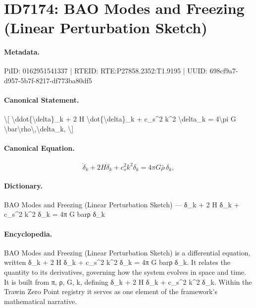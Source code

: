 \section*{ID7174: BAO Modes and Freezing (Linear Perturbation Sketch)}
\paragraph{Metadata.}
PiID: 0162951541337 | RTEID: RTE:P27858.2352:T1.9195 | UUID: 698cf9a7-d957-5b7f-8217-df773ba80df5

\paragraph{Canonical Statement.}
\textbackslash{}[ \textbackslash{}ddot\{\textbackslash{}delta\}\_k + 2 H \textbackslash{}dot\{\textbackslash{}delta\}\_k + c\_s\textasciicircum{}2 k\textasciicircum{}2 \textbackslash{}delta\_k = 4\textbackslash{}pi G \textbackslash{}bar\textbackslash{}rho\textbackslash{},\textbackslash{}delta\_k, \textbackslash{}]

\paragraph{Canonical Equation.}
\[
\ddot{\delta}_k + 2 H \dot{\delta}_k + c_s^2 k^2 \delta_k = 4\pi G \bar\rho\,\delta_k,
\]

\paragraph{Dictionary.}
BAO Modes and Freezing (Linear Perturbation Sketch) — δ\_k + 2 H δ\_k + c\_s\textasciicircum{}2 k\textasciicircum{}2 δ\_k = 4π G barρ δ\_k

\paragraph{Encyclopedia.}
BAO Modes and Freezing (Linear Perturbation Sketch) is a differential equation, written δ\_k + 2 H δ\_k + c\_s\textasciicircum{}2 k\textasciicircum{}2 δ\_k = 4π G barρ δ\_k. It relates the quantity to its derivatives, governing how the system evolves in space and time. It is built from π, ρ, G, k, defining δ\_k + 2 H δ\_k + c\_s\textasciicircum{}2 k\textasciicircum{}2 δ\_k. Within the Trawin Zero Point registry it serves as one element of the framework's mathematical narrative.
